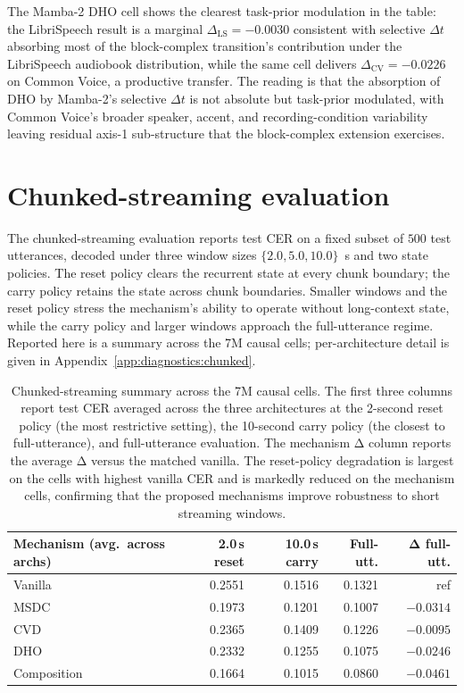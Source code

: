 The Mamba-2 DHO cell shows the clearest task-prior modulation in
the table: the LibriSpeech result is a marginal $\Delta_{\mathrm{LS}}
= -0.0030$ consistent with selective $\Delta t$ absorbing most of
the block-complex transition's contribution under the LibriSpeech
audiobook distribution, while the same cell delivers
$\Delta_{\mathrm{CV}} = -0.0226$ on Common Voice, a productive
transfer. The reading is that the absorption of DHO by Mamba-2's
selective $\Delta t$ is not absolute but task-prior modulated, with
Common Voice's broader speaker, accent, and recording-condition
variability leaving residual axis-1 sub-structure that the
block-complex extension exercises.

\section{Chunked-streaming evaluation}\label{app:results:chunked}

The chunked-streaming evaluation reports test CER on a fixed subset
of $500$ test utterances, decoded under three window sizes
$\{2.0, 5.0, 10.0\}$~s and two state policies. The reset policy
clears the recurrent state at every chunk boundary; the carry
policy retains the state across chunk boundaries. Smaller windows
and the reset policy stress the mechanism's ability to operate
without long-context state, while the carry policy and larger
windows approach the full-utterance regime. Reported here is a
summary across the 7M causal cells; per-architecture detail is
given in Appendix~\ref{app:diagnostics:chunked}.

\begin{table}[!htbp]
\centering
\small
\caption[Chunked-streaming summary, 7M causal]{Chunked-streaming
summary across the 7M causal cells. The first three columns report
test CER averaged across the three architectures at the 2-second
reset policy (the most restrictive setting), the 10-second carry
policy (the closest to full-utterance), and full-utterance
evaluation. The mechanism Δ column reports the average Δ versus the
matched vanilla. The reset-policy degradation is largest on the
cells with highest vanilla CER and is markedly reduced on the
mechanism cells, confirming that the proposed mechanisms improve
robustness to short streaming windows.}
\label{tab:results:chunked-summary}
\setlength{\tabcolsep}{6pt}
\renewcommand{\arraystretch}{1.15}
\begin{tabularx}{\linewidth}{@{}X r r r r@{}}
\toprule
\textbf{Mechanism (avg.\ across archs)} &
\textbf{2.0\,s reset} & \textbf{10.0\,s carry} & \textbf{Full-utt.} &
\textbf{Δ full-utt.} \\
\midrule
Vanilla            & 0.2551 & 0.1516 & 0.1321 & ref      \\
MSDC               & 0.1973 & 0.1201 & 0.1007 & $-0.0314$ \\
CVD                & 0.2365 & 0.1409 & 0.1226 & $-0.0095$ \\
DHO                & 0.2332 & 0.1255 & 0.1075 & $-0.0246$ \\
Composition        & 0.1664 & 0.1015 & 0.0860 & $-0.0461$ \\
\bottomrule
\end{tabularx}
\end{table}

